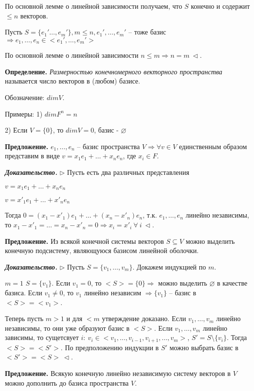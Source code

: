 \bigskip
По основной лемме о линейной зависимости получаем, что $S$ конечно и содержит $\leq n$ векторов.

Пусть $S = \{e_1' \dots, e_m'\}, m \leq n, e_1', \dots, e_m'$ -- тоже базис $\Rightarrow e_1, \dots, e_n \in <e_1', \dots, e_m'>$

По основной лемме о линейной зависимости $n \leq m \Rightarrow n = m \ \lhd$.

\bigskip
\textbf{Определение.} \textit{Размерностью конечномерного векторного пространства} называется число векторов в (любом) базисе.

Обозначение: $dim V$.

Примеры: 1) $dim F^n = n$

2) Если $V = \{0\}$, то $dimV = 0$, базис - $\varnothing$

\bigskip
\textbf{Предложение.} $e_1, \dots, e_n$ -- базис пространства $V \Rightarrow \forall v \in V$ единственным образом представим в виде $v = x_1 e_1 + \dots + x_n e_n$, где $x_i \in F$.

\bigskip
\textbf{\textit{Доказательство.}} $\rhd$ Пусть есть два различных представления

$v = x_1 e_1 + \dots + x_n e_n$

$v = x'_1 e_1 + \dots + x'_n e_n$

Тогда $0 = (x_1 - x'_1) e_1 + \dots + (x_n - x'_n) e_n$, т.к. $e_1, \dots, e_n$ линейно независимы, то $x_1 - x'_1 = \dots = x_n - x'_n = 0 \Rightarrow x_i = x'_i \ \forall \ i \ \lhd$.

\bigskip
\textbf{Предложение.} Из всякой конечной системы векторов $S \subseteq V$ можно выделить конечную подсистему, являющуюся базисом линейной оболочки.

\bigskip
\textbf{\textit{Доказательство.}} $\rhd$ Пусть $S = \{v_1, \dots, v_m\}$. Докажем индукцией по $m$.

$m = 1$ $S = \{v_1\}$. Если $v_1 = 0$, то $<S> = \{0\} \Rightarrow$ можно выделить $\varnothing$ в качестве базиса. Если $v_1 \neq 0$, то $v_1$ линейно независим $\Rightarrow \{v_1\}$ -- базис в $<S> = <v_1>$.

Теперь пусть $m > 1$ и для $<m$ утверждение доказано. Если $v_1, \dots, v_m$ линейно независимы, то они уже образуют базис в $<S>$. Если $v_1, \dots, v_m$ линейно зависимы, то сущетсвует $i: \ v_i \in <v_1, \dots, v_{i-1}, v_{i+1}, \dots, v_m>$, $S' = S \setminus \{v_i\}$. Тогда $<S> = <S'>$. По предположению индукции в $S'$  можно выбрать базис в $<S'> = <S> \ \lhd$.

\bigskip
\textbf{Предложение.} Всякую конечную линейно независимую систему векторов в $V$ можно дополнить до базиса пространства $V$.

